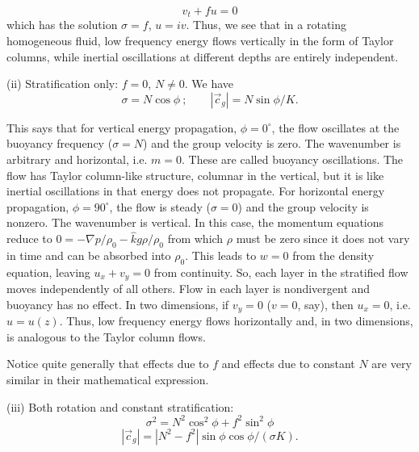 \sourcepagebreak

\[
	v_t+fu=0
\]
which has the solution $\sigma=f$, $u=iv$. Thus, we see that in a rotating homogeneous
fluid, low frequency energy flows vertically in the form of Taylor columns, while inertial
oscillations at different depths are entirely independent.

(ii) Stratification only: $f=0$, $N\ne0$. We have
\[
	\sigma=N\cos\phi\ ;\qquad |\vec c_g|=N\sin\phi/K.
\]


This says that for vertical energy propagation, $\phi=0^\circ$, the flow oscillates at the
buoyancy frequency ($\sigma=N$) and the group velocity is zero. The wavenumber is
arbitrary and horizontal, i.e. $m=0$. These are called buoyancy oscillations. The flow
has Taylor column-like structure, columnar in the vertical, but it is like inertial
oscillations in that energy does not propagate. For horizontal energy propagation,
$\phi=90^\circ$, the flow is steady ($\sigma=0$) and the group velocity is nonzero. The wavenumber
is vertical. In this case, the momentum equations reduce to
$0=-\nabla p/\rho_0-\hat k g\rho/\rho_0$ from which $\rho$ must be zero since it does not vary in time
and can be absorbed into $\rho_0$. This leads to $w=0$ from the density equation, leaving
$u_x+v_y=0$ from continuity. So, each layer in the stratified flow moves independently
of all others. Flow in each layer is nondivergent and buoyancy has no effect. In two
dimensions, if $v_y=0$ ($v=0$, say), then $u_x=0$, i.e. $u=u(z)$. Thus, low frequency
energy flows horizontally and, in two dimensions, is analogous to the Taylor column flows.

\sourcepagebreak

Notice quite generally that effects due to $f$ and effects due to constant $N$ are
very similar in their mathematical expression.

(iii) Both rotation and constant stratification:
\[
	\sigma^2=N^2\cos^2\phi+f^2\sin^2\phi
\]
\[
	|\vec c_g|=|N^2-f^2|\sin\phi\cos\phi/(\sigma K).
\]



